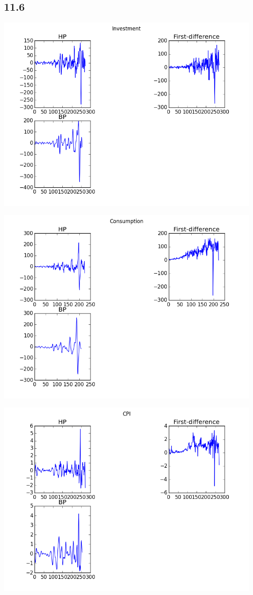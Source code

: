 \documentclass[letterpaper,12pt]{article}
\theoremstyle{definition}
\begin{document}
\subsection*{11.6}


\includegraphics[scale = .75]{elevensixinvestment}

\includegraphics[scale = .75]{elevensixhp}

\includegraphics[scale = .75]{elevensixcpi}
\end{document}
